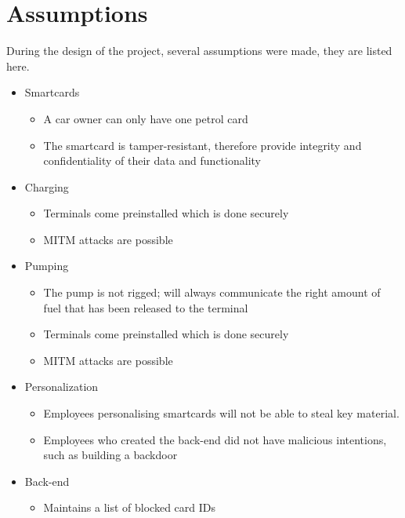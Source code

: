 \section*{Assumptions}
During the design of the project, several assumptions were made, they are listed here.
\begin{itemize}
\item Smartcards
\begin{itemize}
	\item A car owner can only have one petrol card
	\item The smartcard is tamper-resistant, therefore provide integrity and confidentiality of their data and functionality
\end{itemize}

\item Charging
\begin{itemize}
\item Terminals come preinstalled which is done securely
\item MITM attacks are possible
\end{itemize}


\item Pumping
\begin{itemize}
\item The pump is not rigged; will always communicate the right amount of fuel that has been released to the terminal 
\item Terminals come preinstalled which is done securely
\item MITM attacks are possible
\end{itemize}

 
\item Personalization
\begin{itemize}
\item Employees personalising smartcards will not be able to steal key material.
\item Employees who created the back-end did not have malicious intentions, such as building a backdoor
\end{itemize}

\item Back-end
\begin{itemize}
\item Maintains a list of blocked card IDs
\end{itemize}
\end{itemize}

 